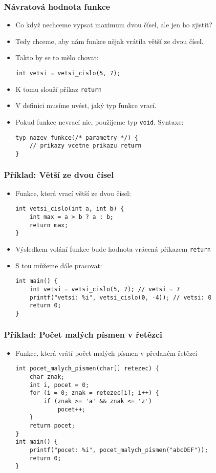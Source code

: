 \documentclass{beamer}
\begin{document}
\begin{frame}[t,fragile]\frametitle{Návratová hodnota funkce} 
    \begin{itemize}
        \item Co když nechceme vypsat maximum dvou čísel, ale jen ho zjistit? 
        \item Tedy chceme, aby nám funkce nějak vrátila větší ze dvou čísel.
        \item Takto by se to mělo chovat: 
        \begin{verbatim} 
int vetsi = vetsi_cislo(5, 7);
        \end{verbatim}
        \item K tomu slouží příkaz \texttt{return} 
        \item V definici musíme uvést, jaký typ funkce vrací. 
        \item Pokud funkce nevrací nic, použijeme typ \texttt{void}. Syntaxe:
        \begin{verbatim} 
typ nazev_funkce(/* parametry */) {
    // prikazy vcetne prikazu return
}
        \end{verbatim}
    \end{itemize}
\end{frame}


\begin{frame}[t,fragile]\frametitle{Příklad: Větší ze dvou čísel} 
    \begin{itemize}
        \item Funkce, která vrací větší ze dvou čísel:
        \begin{verbatim} 
int vetsi_cislo(int a, int b) {
    int max = a > b ? a : b;
    return max;
}
        \end{verbatim}
        \item Výsledkem volání funkce bude hodnota vrácená příkazem \texttt{return}
        \item S tou můžeme dále pracovat:
        \begin{verbatim} 
int main() {
    int vetsi = vetsi_cislo(5, 7); // vetsi = 7
    printf("vetsi: %i", vetsi_cislo(0, -4)); // vetsi: 0
    return 0;
}
        \end{verbatim}
    \end{itemize}
\end{frame}


\begin{frame}[t,fragile]\frametitle{Příklad: Počet malých písmen v řetězci} 
    \begin{itemize}
        \item Funkce, která vrátí počet malých písmen v předaném řetězci
        \begin{verbatim} 
int pocet_malych_pismen(char[] retezec) {
    char znak;
    int i, pocet = 0;
    for (i = 0; znak = retezec[i]; i++) {
        if (znak >= 'a' && znak <= 'z') 
            pocet++;
    }
    return pocet;
}
int main() {
    printf("pocet: %i", pocet_malych_pismen("abcDEF"));
    return 0;
}
        \end{verbatim}
    \end{itemize}
\end{frame}
\end{document}
